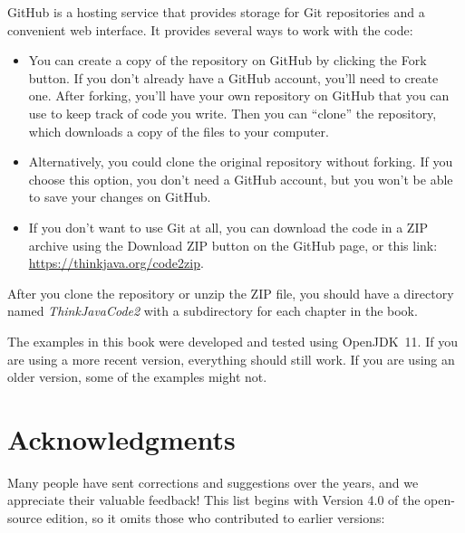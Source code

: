 
GitHub is a hosting service that provides storage for Git repositories and a convenient web interface.
It provides several ways to work with the code:

\begin{itemize}

\item You can create a copy of the repository on GitHub by clicking the {\sf Fork} button.
If you don't already have a GitHub account, you'll need to create one.
After forking, you'll have your own repository on GitHub that you can use to keep track of code you write.
Then you can ``clone'' the repository, which downloads a copy of the files to your computer.

\item Alternatively, you could clone the original repository without forking.
If you choose this option, you don't need a GitHub account, but you won't be able to save your changes on GitHub.

\item If you don't want to use Git at all, you can download the code in a ZIP archive using the {\sf Download ZIP} button on the GitHub page, or this link: \url{https://thinkjava.org/code2zip}.

\end{itemize}

After you clone the repository or unzip the ZIP file, you should have a directory named {\it ThinkJavaCode2} with a subdirectory for each chapter in the book.

The examples in this book were developed and tested using OpenJDK~11.
If you are using a more recent version, everything should still work.
If you are using an older version, some of the examples might not.


\section*{Acknowledgments}

Many people have sent corrections and suggestions over the years, and we appreciate their valuable feedback!
This list begins with Version 4.0 of the open-source edition, so it omits those who contributed to earlier versions:

